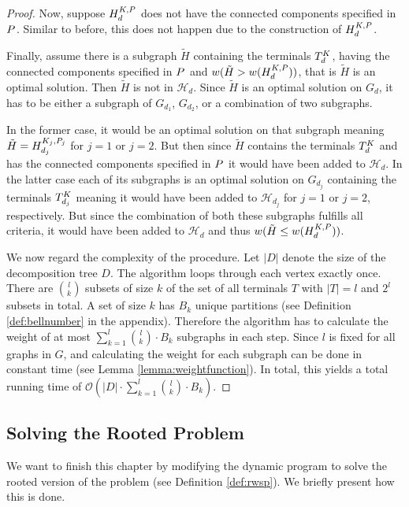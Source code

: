 \begin{proof}
	Now, suppose $H_{d}^{K,P}$ does not have the connected components specified in $P_{}^{}$. Similar to before, this does not happen due to the construction of $H_{d}^{K,P}$.\medskip
	
	Finally, assume there is a subgraph $\tilde{H}$ containing the terminals $T_{d}^{K}$, having the connected components specified in $P_{}^{}$ and $w(\tilde{H} > w(H_{d}^{K,P}))$, that is $\tilde{H}$ is an optimal solution. Then $\tilde{H}$ is not in $\mathcal{H}_{d}$. Since $\tilde{H}$ is an optimal solution on $G_d$, it has to be either a subgraph of $G_{d_1}$, $G_{d_2}$, or a combination of two subgraphs.\medskip
	
	In the former case, it would be an optimal solution on that subgraph meaning $\tilde{H} = H_{d_j}^{K_j,P_j}$ for $j = 1$ or $j = 2$. But then since $\tilde{H}$ contains the terminals $T_{d}^{K}$ and has the connected components specified in $P_{}^{}$ it would have been added to $\mathcal{H}_{d}$. In the latter case each of its subgraphs is an optimal solution on $G_{d_j}$ containing the terminals $T_{d_j}^{K}$ meaning it would have been added to $\mathcal{H}_{d_j}$ for $j = 1$ or $j = 2$, respectively. But since the combination of both these subgraphs fulfills all criteria, it would have been added to $\mathcal{H}_{d}$ and thus $w(\tilde{H} \leq w(H_{d}^{K,P}))$.\medskip
	
	We now regard the complexity of the procedure. Let $|D|$ denote the size of the decomposition tree $D$. The algorithm loops through each vertex exactly once. There are $\binom{l}{k}$ subsets of size $k$ of the set of all terminals $T$ with $|T|=l$ and $2^l$ subsets in total. A set of size $k$ has $B_k$ unique partitions (see Definition \ref{def:bellnumber} in the appendix). Therefore the algorithm has to calculate the weight of at most $\sum_{k=1}^{l} \binom{l}{k} \cdot B_k$ subgraphs in each step. Since $l$ is fixed for all graphs in $G$, and calculating the weight for each subgraph can be done in constant time (see Lemma \ref{lemma:weightfunction}). In total, this yields a total running time of $\mathcal{O}(|D| \cdot \sum_{k=1}^{l} \binom{l}{k} \cdot B_k)$.	
\end{proof}


\subsection{Solving the Rooted Problem}
\label{sec:dynamicprog:rooted}

We want to finish this chapter by modifying the dynamic program to solve the rooted version of the problem (see Definition \ref{def:rwsp}). We briefly present how this is done.\medskip

